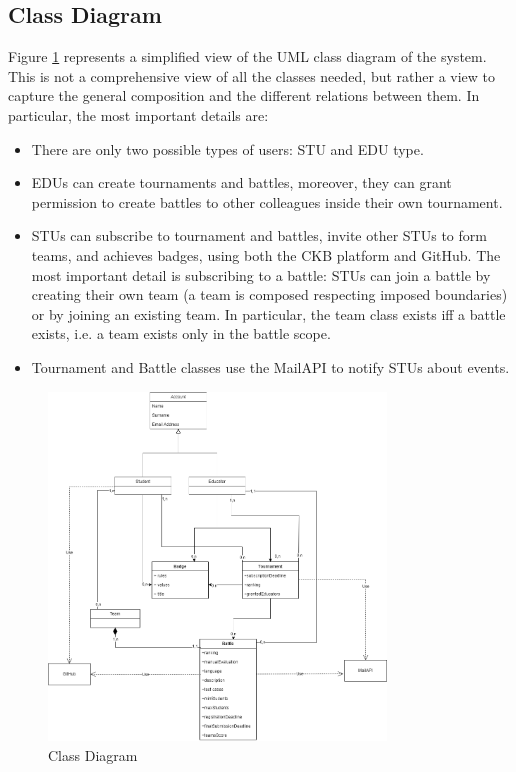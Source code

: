\subsection{Class Diagram}
Figure \ref{fig:class-diagram} represents a simplified view of the UML class diagram of the system.
This is not a comprehensive view of all the classes needed, but rather a view to capture the general composition and the different relations between them.
In particular, the most important details are:
\begin{itemize}
    \item There are only two possible types of users: STU and EDU type.
    \item EDUs can create tournaments and battles, moreover, they can grant permission to create battles to other colleagues inside their own tournament.
    \item STUs can subscribe to tournament and battles, invite other STUs to form teams, and achieves badges, using both the CKB platform and GitHub.
          The most important detail is subscribing to a battle: STUs can join a battle by creating their own team (a team is composed respecting imposed boundaries) or by joining an existing team.
          In particular, the team class exists iff a battle exists, i.e. a team exists only in the battle scope.
    \item Tournament and Battle classes use the MailAPI to notify STUs about events.
\end{itemize}

\begin{figure}[H]
    \centering
    \includegraphics[width=0.8\textwidth]{images/state_diagrams/ClassDiagram.png}
    \caption{Class Diagram}
    \label{fig:class-diagram}
\end{figure}

